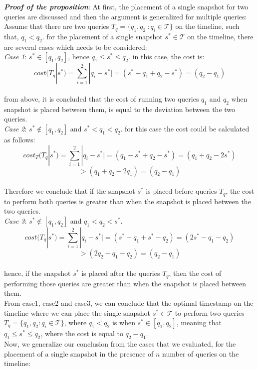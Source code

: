 \textbf{\emph{Proof of the proposition}}:
At first, the placement of a single snapshot for two queries are discussed and then the argument is generalized for multiple queries:\\
Assume that there are two queries $T_q=\{q_1,q_2\ : q_i \in \mathcal{T}\}$ on the timeline, such that, $q_1<q_2$. for the placement of a single snapshot $s^* \in \mathcal{T}$ on the timeline, there are several cases which needs to be considered:\\
\emph{Case 1}:
$s^* \in [q_1,q_2]$, hence $q_1\leq s^*\leq q_2$.
in this case, the cost is:\\
$$cost(T_q|s^*)=\sum_{i=1}^2|q_i-s^*| = (s^*-q_1+q_2-s^*)=(q_2-q_1)$$\\
from above, it is concluded that the cost of running two queries $q_1$ and $q_2$ when snapshot is placed between them, is equal to the deviation between the two queries.\\
\emph{Case 2}:
$s^* \notin [q_1,q_2]$ and $s^* < q_1 < q_2$. for this case the cost could be calculated as follows:
$$cost_T(T_q|s^*)=\sum_{i=1}^2|q_i-s^*| = (q_1-s^*+q_2-s^*)=(q_1+q_2-2s^*) $$$$>(q_1+q_2-2q_1)=(q_2-q_1)$$\\
Therefore we conclude that if the snapshot $s^*$ is placed before queries $T_q$, the cost to perform both queries is greater than when the snapshot is placed between the two queries.\\
\emph{Case 3}:
$s^* \notin [q_1,q_2]$ and $q_1 < q_2 < s^*$.
$$cost(T_q|s^*)=\sum_{i=1}^2|q_i-s^*| = (s^*-q_1+s^*-q_2)=(2s^*-q_1-q_2) $$$$>(2q_2-q_1-q_2)=(q_2-q_1)$$\\
hence, if the snapshot $s^*$ is placed after the queries $T_q$, then the cost of performing those queries are greater than when the snapshot is placed between them.\\
From case1, case2 and case3, we can conclude that the optimal timestamp on the timeline where we can place the single snapshot $s^* \in \mathcal{T}$ to perform two queries $T_q = \{q_1,q_2:q_i\in \mathcal{T}\}$, where $q_1<q_2$ is when $s^* \in [q_1,q_2]$, meaning that $q_1 \leq s^* \leq q_2$, where the cost is equal to $q_2-q_1$.\\

Now, we generalize our conclusion from the cases that we evaluated, for the placement of a single snapshot in the presence of $n$ number of queries on the timeline: 

